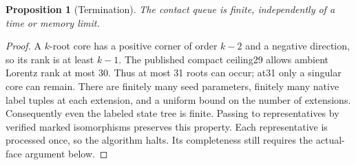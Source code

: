 \documentclass[11pt]{article}
\newtheorem{proposition}[theorem]{Proposition}
\begin{document}
\begin{proposition}[Termination]\label{prop:queue-termination}
The contact queue is finite, independently of a time or memory limit.
\end{proposition}
\begin{proof}
A $k$-root core has a positive corner of order $k-2$ and a negative
direction, so its rank is at least $k-1$. The published compact
ceiling29 allows ambient Lorentz rank at most 30. Thus at most 31
roots can occur; at31 only a singular core can remain. There are
finitely many seed parameters, finitely many native label tuples
at each extension, and a uniform bound on the number of extensions.
Consequently even the labeled state tree is finite. Passing to
representatives by verified marked isomorphisms preserves this
property. Each representative is processed once, so the algorithm
halts. Its completeness still requires the actual-face argument below.
\end{proof}
\end{document}
